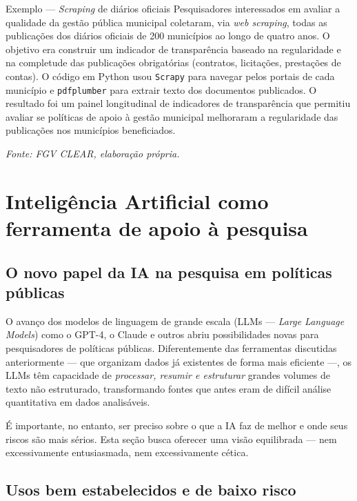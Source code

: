 \begin{boxexemplo}{Exemplo --- \textit{Scraping} de diários oficiais}
Pesquisadores interessados em avaliar a qualidade da gestão pública municipal coletaram, via \textit{web scraping}, todas as publicações dos diários oficiais de 200 municípios ao longo de quatro anos. O objetivo era construir um indicador de transparência baseado na regularidade e na completude das publicações obrigatórias (contratos, licitações, prestações de contas). O código em Python usou \texttt{Scrapy} para navegar pelos portais de cada município e \texttt{pdfplumber} para extrair texto dos documentos publicados. O resultado foi um painel longitudinal de indicadores de transparência que permitiu avaliar se políticas de apoio à gestão municipal melhoraram a regularidade das publicações nos municípios beneficiados.

\textit{Fonte: FGV CLEAR, elaboração própria.}
\end{boxexemplo}

\section{Inteligência Artificial como ferramenta de apoio à pesquisa}

\subsection{O novo papel da IA na pesquisa em políticas públicas}

O avanço dos modelos de linguagem de grande escala (LLMs --- \textit{Large Language Models}) como o GPT-4, o Claude e outros abriu possibilidades novas para pesquisadores de políticas públicas. Diferentemente das ferramentas discutidas anteriormente --- que organizam dados já existentes de forma mais eficiente ---, os LLMs têm capacidade de \textit{processar, resumir e estruturar} grandes volumes de texto não estruturado, transformando fontes que antes eram de difícil análise quantitativa em dados analisáveis.

É importante, no entanto, ser preciso sobre o que a IA faz de melhor e onde seus riscos são mais sérios. Esta seção busca oferecer uma visão equilibrada --- nem excessivamente entusiasmada, nem excessivamente cética.

\subsection{Usos bem estabelecidos e de baixo risco}

